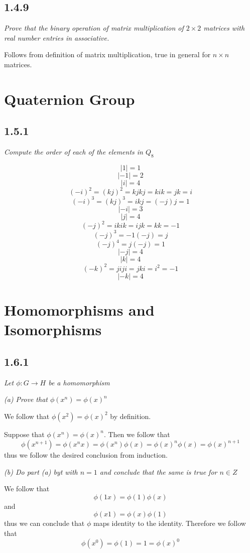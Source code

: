 \documentclass[11pt,oneside,titlepage]{book}
\begin{document}
\subsection*{1.4.9}

\textit{Prove that the binary operation of matrix multiplication of $2 \times 2$ matrices
  with real number entries in associative.}

Follows from definition of matrix multiplication, true in general for $n \times n$
matrices.

\section{Quaternion Group}

\subsection*{1.5.1}

\textit{Compute the order of each of the elements in $Q_8$}

$$|1| = 1$$
$$|-1| = 2$$
$$|i| = 4$$
$$(-i)^2 = (kj)^2 = kjkj = kik = jk = i$$
$$(-i)^3 = (kj)^3 = ikj = (-j)j = 1$$
$$|-i| = 3$$
$$|j| = 4$$
$$(-j)^2 = ikik = ijk = kk = -1$$
$$(-j)^3 = -1(-j) = j$$
$$(-j)^4 = j(-j) = 1$$
$$|-j| = 4$$
$$|k| = 4$$
$$(-k)^2 = jiji = jki = i^2 = -1$$
$$|-k| = 4$$

\section{Homomorphisms and Isomorphisms}

\subsection*{1.6.1}

\textit{Let $\phi: G \to H$ be a homomorphism}

\textit{(a) Prove that $\phi(x^n) = \phi(x)^n$}

We follow that $\phi(x^2) = \phi(x)^2$ by definition.

Suppose that $\phi(x^n) = \phi(x)^n$. Then we follow that
$$\phi(x^{n + 1}) = \phi(x^{n} x) = \phi(x^{n}) \phi(x) =
\phi(x)^n \phi(x) = \phi(x)^{n + 1}
$$
thus we follow the desired conclusion from induction.

\textit{(b) Do part (a) byt with $n = 1$ and conclude that the same is true for $n \in Z$}

We follow that $$\phi(1x) = \phi(1) \phi(x)$$
and $$\phi(x1) = \phi(x) \phi(1)$$
thus we can conclude that $\phi$ maps identity to the identity. Therefore we follow that
$$\phi(x^0) = \phi(1) = 1 = \phi(x)^0$$
\end{document}
